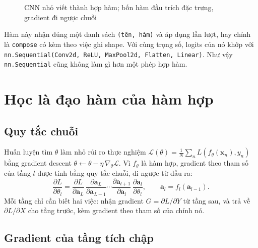 \begin{figure}[H]
  \centering
  \caption{CNN nhỏ viết thành hợp hàm; bốn hàm đầu trích đặc trưng, gradient đi ngược chuỗi}
  \label{fig:hopham}
\end{figure}

\begin{table}[H]
  \centering
  \caption{Shape sau từng hàm của CNN nhỏ (notebook 00)}
  \label{tab:tinytrace}
  
\end{table}


\noindent Hàm này nhận đúng một danh sách \texttt{(tên, hàm)} và áp dụng lần lượt, hay chính là
\texttt{compose} có kèm theo việc ghi shape. Với cùng trọng số, logits của nó khớp với
\texttt{nn.Sequential(Conv2d, ReLU, MaxPool2d, Flatten, Linear)}. Như vậy \texttt{nn.Sequential} cũng không
làm gì hơn một phép hợp hàm.

\section{Học là đạo hàm của hàm hợp}

\subsection{Quy tắc chuỗi}

Huấn luyện tìm $\theta$ làm nhỏ rủi ro thực nghiệm
$\mathcal{L}(\theta) = \frac{1}{N}\sum_{n} L(f_\theta(\mathbf{x}_n), y_n)$ bằng gradient descent
$\theta \leftarrow \theta - \eta\,\nabla_\theta\mathcal{L}$. Vì $f_\theta$ là hàm hợp, gradient theo tham số
của tầng $l$ được tính bằng quy tắc chuỗi, đi ngược từ đầu ra:
\[
  \frac{\partial L}{\partial \theta_l}
  = \frac{\partial L}{\partial \mathbf{a}_L}\,
    \frac{\partial \mathbf{a}_L}{\partial \mathbf{a}_{L-1}}\cdots
    \frac{\partial \mathbf{a}_{l+1}}{\partial \mathbf{a}_{l}}\,
    \frac{\partial \mathbf{a}_{l}}{\partial \theta_l},
  \qquad \mathbf{a}_l = f_l(\mathbf{a}_{l-1}).
\]
Mỗi tầng chỉ cần biết hai việc: nhận gradient $G = \partial L/\partial Y$ từ tầng sau, và trả về
$\partial L/\partial X$ cho tầng trước, kèm gradient theo tham số của chính nó.

\subsection{Gradient của tầng tích chập}


